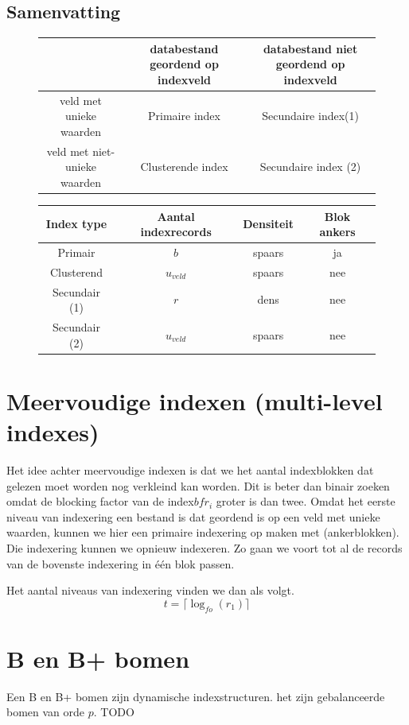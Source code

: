 \documentclass[indexstructuren.tex]{subfiles}
\begin{document}
\subsection{Samenvatting}
\begin{figure}[H]
\centering
\begin{tabular}{c|c|c|}
& databestand geordend op indexveld & databestand niet geordend op indexveld\\\hline
veld met unieke waarden & Primaire index & Secundaire index(1)\\\hline
veld met niet-unieke waarden & Clusterende index & Secundaire index (2)\\\hline
\end{tabular}
\end{figure}
\begin{figure}[H]
\centering
\begin{tabular}{c|c|c|c}
Index type & Aantal indexrecords & Densiteit & Blok ankers\\\hline\hline
Primair & $b$ & spaars & ja\\
Clusterend & $u_{veld}$ & spaars & nee\\
Secundair (1) & $r$ & dens & nee\\
Secundair (2) & $u_{veld}$ & spaars & nee\\
\end{tabular}
\end{figure}

\section{Meervoudige indexen (multi-level indexes)}
Het idee achter meervoudige indexen is dat we het aantal indexblokken dat gelezen moet worden nog verkleind kan worden. Dit is beter dan binair zoeken omdat de blocking factor van de index$bfr_i$ groter is dan twee.
Omdat het eerste niveau van indexering een bestand is dat geordend is op een veld met unieke waarden, kunnen we hier een primaire indexering op maken met (ankerblokken).
Die indexering kunnen we opnieuw indexeren. 
Zo gaan we voort tot al de records van de bovenste indexering in \'e\'en blok passen. 

\noindent Het aantal niveaus van indexering vinden we dan als volgt.
\[
t = \lceil \log_{fo}(r_1) \rceil
\]

\section{B en B+ bomen}
Een B en B+ bomen zijn dynamische indexstructuren. het zijn gebalanceerde bomen van orde $p$. TODO
\end{document}
